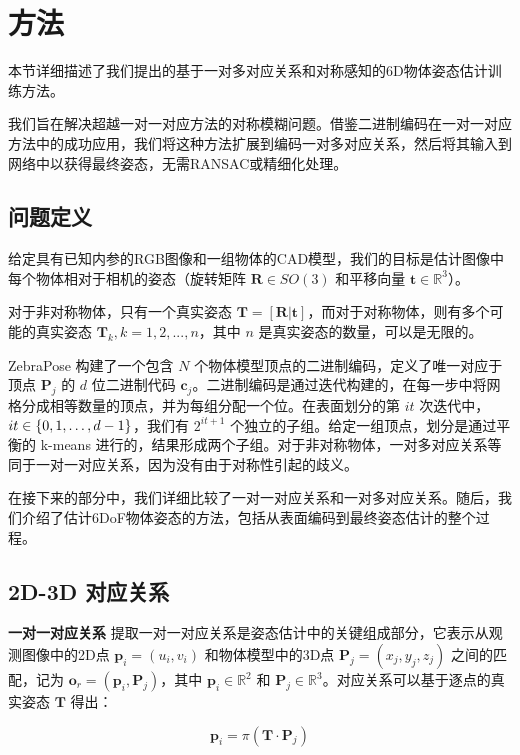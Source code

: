 \section{方法}

本节详细描述了我们提出的基于一对多对应关系和对称感知的6D物体姿态估计训练方法。

我们旨在解决超越一对一对应方法的对称模糊问题。借鉴二进制编码在一对一对应方法中的成功应用\cite{2024hipose, su2022zebrapose}，我们将这种方法扩展到编码一对多对应关系，然后将其输入到网络中以获得最终姿态，无需RANSAC或精细化处理。

\subsection{问题定义}

给定具有已知内参的RGB图像和一组物体的CAD模型，我们的目标是估计图像中每个物体相对于相机的姿态（旋转矩阵 $\mathbf{R} \in SO(3)$ 和平移向量 $\mathbf{t} \in \mathbb{R}^3$）。

对于非对称物体，只有一个真实姿态 $\mathbf{T}=[\mathbf{R}|\mathbf{t}]$，而对于对称物体，则有多个可能的真实姿态 $\mathbf{T}_k, k=1, 2,...,n$，其中 $n$ 是真实姿态的数量，可以是无限的。

ZebraPose\cite{su2022zebrapose} 构建了一个包含 $N$ 个物体模型顶点的二进制编码，定义了唯一对应于顶点 $\mathbf{P}_j$ 的 $d$ 位二进制代码 $\mathbf{c}_{j}$。二进制编码是通过迭代构建的，在每一步中将网格分成相等数量的顶点，并为每组分配一个位。在表面划分的第 $it$ 次迭代中，$it \in \{0, 1, \text{\textellipsis}, d-1\}$，我们有 $2^{it+1}$ 个独立的子组。给定一组顶点，划分是通过平衡的 k-means 进行的，结果形成两个子组。对于非对称物体，一对多对应关系等同于一对一对应关系，因为没有由于对称性引起的歧义。

在接下来的部分中，我们详细比较了一对一对应关系和一对多对应关系。随后，我们介绍了估计6DoF物体姿态的方法，包括从表面编码到最终姿态估计的整个过程。

\subsection{2D-3D 对应关系}
\textbf{一对一对应关系 } 提取一对一对应关系是姿态估计中的关键组成部分，它表示从观测图像中的2D点 $\mathbf{p}_i=(u_i,v_i)$ 和物体模型中的3D点 $\mathbf{P}_j=(x_j,y_j,z_j)$ 之间的匹配，记为 $\mathbf{o}_r = (\mathbf{p}_i, \mathbf{P}_j)$，其中 $\mathbf{p}_i\in \mathbb{R}^2$ 和 $\mathbf{P}_j\in \mathbb{R}^3$。对应关系可以基于逐点的真实姿态 $\mathbf{T}$ 得出：

\begin{equation}
        \mathbf{p}_i=\pi(\mathbf{T}\cdot \mathbf{P}_j) 
        \label{eq:projection}
\end{equation}


